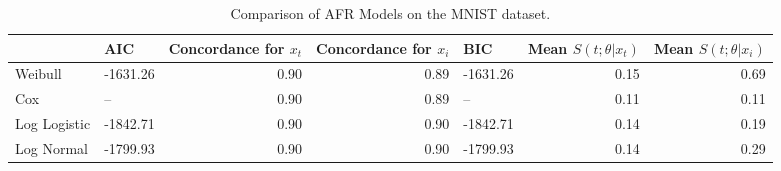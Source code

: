 \begin{table}
\caption{Comparison of AFR Models on the MNIST dataset.}
\label{tab:mnist}
\begin{tabular}{llrrlrr}
\toprule
 & AIC & Concordance for $x_t$ & Concordance for $x_i$ & BIC & Mean $S(t;\theta|x_{t})$ & Mean $S(t;\theta|x_{i})$ \\
\midrule
Weibull & -1631.26 & 0.90 & 0.89 & -1631.26 & 0.15 & 0.69 \\
Cox & -- & 0.90 & 0.89 & -- & 0.11 & 0.11 \\
Log Logistic & -1842.71 & 0.90 & 0.90 & -1842.71 & 0.14 & 0.19 \\
Log Normal & -1799.93 & 0.90 & 0.90 & -1799.93 & 0.14 & 0.29 \\
\bottomrule
\end{tabular}
\end{table}

